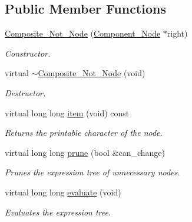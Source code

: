 \subsection*{Public Member Functions}
\begin{DoxyCompactItemize}
\item 
\hyperlink{classMadara_1_1Expression__Tree_1_1Composite__Not__Node_a68295218e4907ac3c530b4123989bdef}{Composite\_\-Not\_\-Node} (\hyperlink{classMadara_1_1Expression__Tree_1_1Component__Node}{Component\_\-Node} $\ast$right)
\begin{DoxyCompactList}\small\item\em Constructor. \item\end{DoxyCompactList}\item 
virtual \hyperlink{classMadara_1_1Expression__Tree_1_1Composite__Not__Node_a1e96dcfb293a45e02d30601f7f2d95de}{$\sim$Composite\_\-Not\_\-Node} (void)
\begin{DoxyCompactList}\small\item\em Destructor. \item\end{DoxyCompactList}\item 
virtual long long \hyperlink{classMadara_1_1Expression__Tree_1_1Composite__Not__Node_aca37f44ff004d68a559b7b0dac9ec51e}{item} (void) const 
\begin{DoxyCompactList}\small\item\em Returns the printable character of the node. \item\end{DoxyCompactList}\item 
virtual long long \hyperlink{classMadara_1_1Expression__Tree_1_1Composite__Not__Node_ad6cca9a480df314dd71006bfa2dfd96e}{prune} (bool \&can\_\-change)
\begin{DoxyCompactList}\small\item\em Prunes the expression tree of unnecessary nodes. \item\end{DoxyCompactList}\item 
virtual long long \hyperlink{classMadara_1_1Expression__Tree_1_1Composite__Not__Node_a25e21eaef918e8638a7141ef8b2f4a94}{evaluate} (void)
\begin{DoxyCompactList}\small\item\em Evaluates the expression tree. \item\end{DoxyCompactList}\item 

\end{DoxyCompactItemize}

